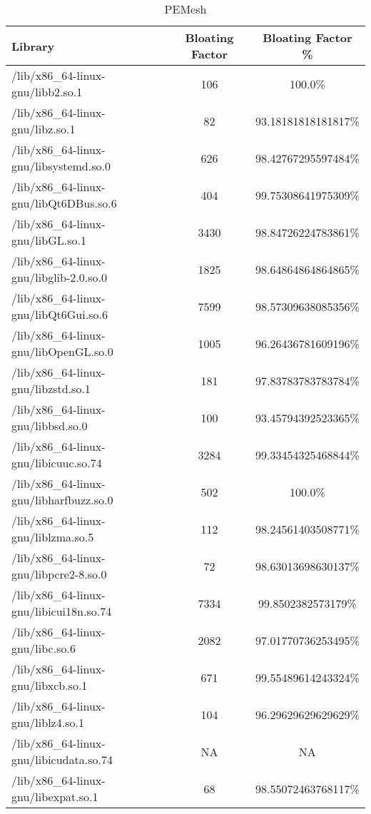 \begin{table}[h]

\centering
\caption{PEMesh}
\footnotesize
\begin{tabular}{l|c|c}
\toprule
Library & Bloating Factor & Bloating Factor \% \\ \midrule
/lib/x86\_64-linux-gnu/libb2.so.1 & 106 & 100.0\% \\ \hline
/lib/x86\_64-linux-gnu/libz.so.1 & 82 & 93.18181818181817\% \\ \hline
/lib/x86\_64-linux-gnu/libsystemd.so.0 & 626 & 98.42767295597484\% \\ \hline
/lib/x86\_64-linux-gnu/libQt6DBus.so.6 & 404 & 99.75308641975309\% \\ \hline
\colorbox{gray!20}{/lib/x86\_64-linux-gnu/libGL.so.1} & 3430 & 98.84726224783861\% \\ \hline
/lib/x86\_64-linux-gnu/libglib-2.0.so.0 & 1825 & 98.64864864864865\% \\ \hline
\colorbox{gray!20}{/lib/x86\_64-linux-gnu/libQt6Gui.so.6} & 7599 & 98.57309638085356\% \\ \hline
/lib/x86\_64-linux-gnu/libOpenGL.so.0 & 1005 & 96.26436781609196\% \\ \hline
/lib/x86\_64-linux-gnu/libzstd.so.1 & 181 & 97.83783783783784\% \\ \hline
/lib/x86\_64-linux-gnu/libbsd.so.0 & 100 & 93.45794392523365\% \\ \hline
/lib/x86\_64-linux-gnu/libicuuc.so.74 & 3284 & 99.33454325468844\% \\ \hline
/lib/x86\_64-linux-gnu/libharfbuzz.so.0 & 502 & 100.0\% \\ \hline
/lib/x86\_64-linux-gnu/liblzma.so.5 & 112 & 98.24561403508771\% \\ \hline
/lib/x86\_64-linux-gnu/libpcre2-8.so.0 & 72 & 98.63013698630137\% \\ \hline
/lib/x86\_64-linux-gnu/libicui18n.so.74 & 7334 & 99.8502382573179\% \\ \hline
\colorbox{gray!20}{/lib/x86\_64-linux-gnu/libc.so.6} & 2082 & 97.01770736253495\% \\ \hline
/lib/x86\_64-linux-gnu/libxcb.so.1 & 671 & 99.55489614243324\% \\ \hline
/lib/x86\_64-linux-gnu/liblz4.so.1 & 104 & 96.29629629629629\% \\ \hline
/lib/x86_64-linux-gnu/libicudata.so.74 & NA & NA \\ \hline
/lib/x86\_64-linux-gnu/libexpat.so.1 & 68 & 98.55072463768117\% \\ \hline

\end{tabular}
\end{table}
